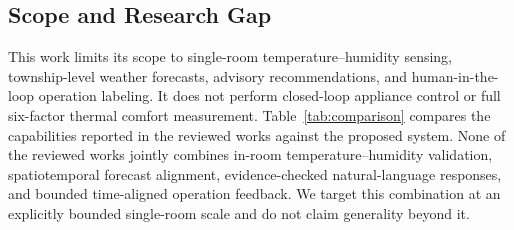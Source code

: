 \subsection{Scope and Research Gap}
This work limits its scope to single-room temperature--humidity sensing, township-level weather forecasts, advisory recommendations, and human-in-the-loop operation labeling. It does not perform closed-loop appliance control or full six-factor thermal comfort measurement. Table~\ref{tab:comparison} compares the capabilities reported in the reviewed works against the proposed system. None of the reviewed works jointly combines in-room temperature--humidity validation, spatiotemporal forecast alignment, evidence-checked natural-language responses, and bounded time-aligned operation feedback. We target this combination at an explicitly bounded single-room scale and do not claim generality beyond it.
